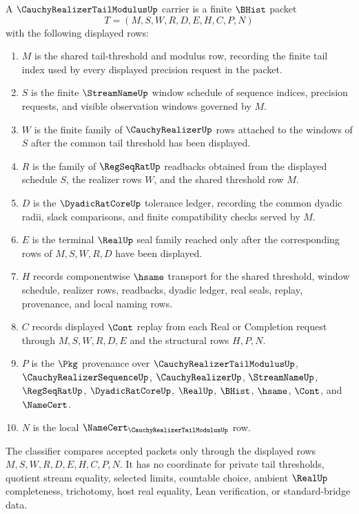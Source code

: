 \begin{definition}
\label{def:cauchy-realizer-tail-modulus-carrier}
A $\CauchyRealizerTailModulusUp$ carrier is a finite $\BHist$ packet
$$
T=(M,S,W,R,D,E,H,C,P,N)
$$
with the following displayed rows:
\begin{enumerate}
\item $M$ is the shared tail-threshold and modulus row, recording the finite tail index used by every displayed precision request in the packet.
\item $S$ is the finite $\StreamNameUp$ window schedule of sequence indices, precision requests, and visible observation windows governed by $M$.
\item $W$ is the finite family of $\CauchyRealizerUp$ rows attached to the windows of $S$ after the common tail threshold has been displayed.
\item $R$ is the family of $\RegSeqRatUp$ readbacks obtained from the displayed schedule $S$, the realizer rows $W$, and the shared threshold row $M$.
\item $D$ is the $\DyadicRatCoreUp$ tolerance ledger, recording the common dyadic radii, slack comparisons, and finite compatibility checks served by $M$.
\item $E$ is the terminal $\RealUp$ seal family reached only after the corresponding rows of $M,S,W,R,D$ have been displayed.
\item $H$ records componentwise $\hsame$ transport for the shared threshold, window schedule, realizer rows, readbacks, dyadic ledger, real seals, replay, provenance, and local naming rows.
\item $C$ records displayed $\Cont$ replay from each Real or Completion request through $M,S,W,R,D,E$ and the structural rows $H,P,N$.
\item $P$ is the $\Pkg$ provenance over $\CauchyRealizerTailModulusUp$, $\CauchyRealizerSequenceUp$, $\CauchyRealizerUp$, $\StreamNameUp$, $\RegSeqRatUp$, $\DyadicRatCoreUp$, $\RealUp$, $\BHist$, $\hsame$, $\Cont$, and $\NameCert$.
\item $N$ is the local $\NameCert_{\CauchyRealizerTailModulusUp}$ row.
\end{enumerate}
The classifier compares accepted packets only through the displayed rows $M,S,W,R,D,E,H,C,P,N$. It has no coordinate for private tail thresholds, quotient stream equality, selected limits, countable choice, ambient $\RealUp$ completeness, trichotomy, host real equality, Lean verification, or standard-bridge data.
\end{definition}

